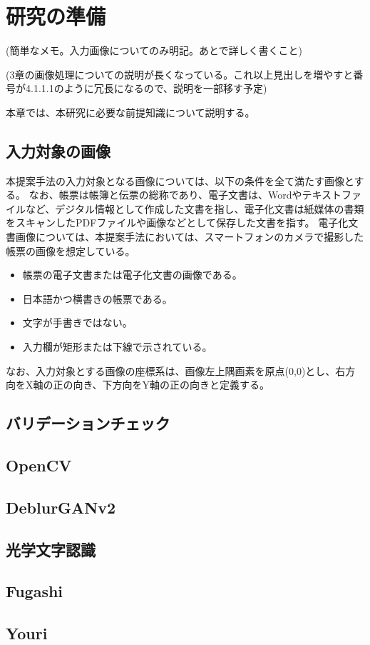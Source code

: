 \chapter{研究の準備}\label{cha:Preparation}
(簡単なメモ。入力画像についてのみ明記。あとで詳しく書くこと)

(3章の画像処理についての説明が長くなっている。これ以上見出しを増やすと番号が4.1.1.1のように冗長になるので、説明を一部移す予定)

本章では、本研究に必要な前提知識について説明する。


\section{入力対象の画像}\label{sec:input_images}
本提案手法の入力対象となる画像については、以下の条件を全て満たす画像とする。
なお、帳票は帳簿と伝票の総称であり\cite{帳票}、電子文書は、Wordやテキストファイルなど、デジタル情報として作成した文書を指し、電子化文書は紙媒体の書類をスキャンしたPDFファイルや画像などとして保存した文書を指す\cite{電子文書と電子化文書}。
電子化文書画像については、本提案手法においては、スマートフォンのカメラで撮影した帳票の画像を想定している。

\begin{itemize}
  \item 帳票の電子文書または電子化文書の画像である。
  \item 日本語かつ横書きの帳票である。
  \item 文字が手書きではない。
  \item 入力欄が矩形または下線で示されている。
\end{itemize}

なお、入力対象とする画像の座標系は、画像左上隅画素を原点(0,0)とし、右方向をX軸の正の向き、下方向をY軸の正の向きと定義する。

\section{バリデーションチェック}\label{sec:validation_check}


\section{OpenCV}\label{sec:OpenCV}



\section{DeblurGANv2}\label{sec:Deblur-GANv2}



\section{光学文字認識}\label{sec:Optical-Charactor-Recognition}


\section{Fugashi}\label{sec:Fugashi}



\section{Youri}\label{sec:Youri}
